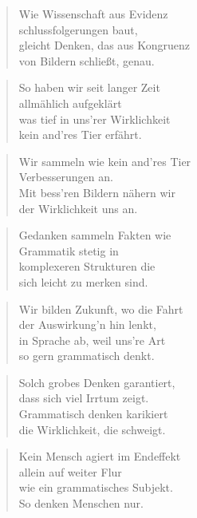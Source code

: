 \documentclass[10pt,a4paper]{article}
\begin{document}
\begin{paracol}{2}
\begin{verse}
Wie Wissenschaft aus Evidenz \\
schlussfolgerungen baut, \\
gleicht Denken, das aus Kongruenz \\
von Bildern schließt, genau. \\
\end{verse}

\begin{verse}
So haben wir seit langer Zeit \\
allmählich aufgeklärt \\
was tief in uns’rer Wirklichkeit \\
kein and’res Tier erfährt. \\
\end{verse}

\begin{verse}
Wir sammeln wie kein and’res Tier \\
Verbesserungen an. \\
Mit bess’ren Bildern nähern wir \\
der Wirklichkeit uns an. \\
\end{verse}

\begin{verse}
Gedanken sammeln Fakten wie \\
Grammatik stetig in \\
komplexeren Strukturen die \\
sich leicht zu merken sind. \\
\end{verse}

\begin{verse}
Wir bilden Zukunft, wo die Fahrt \\
der Auswirkung’n hin lenkt, \\
in Sprache ab, weil uns’re Art \\
so gern grammatisch denkt. \\
\end{verse}

\begin{verse}
Solch grobes Denken garantiert, \\
dass sich viel Irrtum zeigt. \\
Grammatisch denken karikiert \\
die Wirklichkeit, die schweigt. \\
\end{verse}

\begin{verse}
Kein Mensch agiert im Endeffekt \\
allein auf weiter Flur \\
wie ein grammatisches Subjekt. \\
So denken Menschen nur. \\
\end{verse}


\end{paracol}
\end{document}
